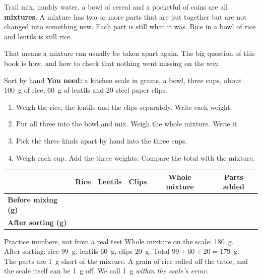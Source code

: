\label{ch1}

Trail mix, muddy water, a bowl of cereal and a pocketful of coins are all \textbf{mixtures}. A mixture has two or more parts that are put together but are not changed into something new. Each part is still what it was. Rice in a bowl of rice and lentils is still rice.

That means a mixture can usually be taken apart again. The big question of this book is how, and how to check that nothing went missing on the way.

\begin{tryit}{Sort by hand}
\textbf{You need:} a kitchen scale in grams, a bowl, three cups, about 100~g of rice, 60~g of lentils and 20 steel paper clips.
\begin{enumerate}[leftmargin=1.6em]
\item Weigh the rice, the lentils and the clips separately. Write each weight.
\item Put all three into the bowl and mix. Weigh the whole mixture. Write it.
\item Pick the three kinds apart by hand into the three cups.
\item Weigh each cup. Add the three weights. Compare the total with the mixture.
\end{enumerate}
\par\medskip
\renewcommand{\arraystretch}{1.6}
\begin{tabular}{|l|c|c|c|c|c|}
\hline
 & \textbf{Rice} & \textbf{Lentils} & \textbf{Clips} & \textbf{Whole mixture} & \textbf{Parts added}\\ \hline
\textbf{Before mixing (g)} & & & & & \\ \hline
\textbf{After sorting (g)} & & & & & \\ \hline
\end{tabular}
\end{tryit}

\begin{worked}{Practice numbers, not from a real test}
Whole mixture on the scale: 180~g.\\
After sorting: rice 99~g, lentils 60~g, clips 20~g. Total $99+60+20=179$~g.\\
The parts are 1~g short of the mixture. A grain of rice rolled off the table, and the scale itself can be 1~g off. We call 1~g \emph{within the scale's error}.
\end{worked}

